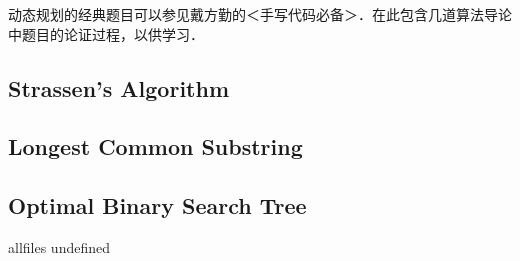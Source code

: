 \documentclass[a4paper,10pt]{article}
\begin{document}
\begin{CJK}{UTF8}{gbsn}     %

\else

动态规划的经典题目可以参见戴方勤的＜手写代码必备＞．在此包含几道算法导论中题目的论证过程，以供学习．
\subsection{Strassen's Algorithm}

\subsection{Longest Common Substring}

\subsection{Optimal Binary Search Tree}



\fi

\ifx allfiles undefined
\end{CJK}
\end{document}
